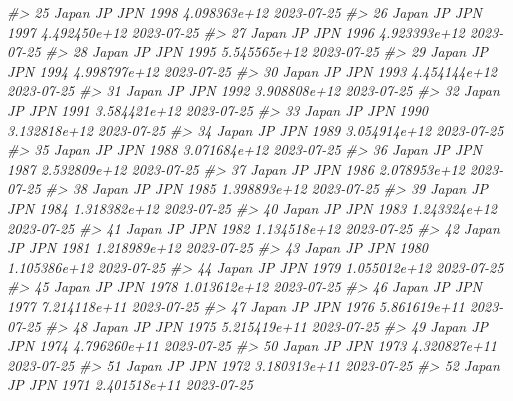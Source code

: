 \documentclass[
  xelatex, ja=standard]{bxjsbook}
\newenvironment{Shaded}{\begin{snugshade}}{\end{snugshade}}
\newcommand{\CommentTok}[1]{\textcolor[rgb]{0.56,0.35,0.01}{\textit{#1}}}
\theoremstyle{definition}
\theoremstyle{definition}
\theoremstyle{definition}
\theoremstyle{definition}
\theoremstyle{remark}
\begin{document}
\begin{Shaded}
\begin{Highlighting}[]
\CommentTok{\#\textgreater{} 25   Japan    JP   JPN 1998 4.098363e+12         2023{-}07{-}25}
\CommentTok{\#\textgreater{} 26   Japan    JP   JPN 1997 4.492450e+12         2023{-}07{-}25}
\CommentTok{\#\textgreater{} 27   Japan    JP   JPN 1996 4.923393e+12         2023{-}07{-}25}
\CommentTok{\#\textgreater{} 28   Japan    JP   JPN 1995 5.545565e+12         2023{-}07{-}25}
\CommentTok{\#\textgreater{} 29   Japan    JP   JPN 1994 4.998797e+12         2023{-}07{-}25}
\CommentTok{\#\textgreater{} 30   Japan    JP   JPN 1993 4.454144e+12         2023{-}07{-}25}
\CommentTok{\#\textgreater{} 31   Japan    JP   JPN 1992 3.908808e+12         2023{-}07{-}25}
\CommentTok{\#\textgreater{} 32   Japan    JP   JPN 1991 3.584421e+12         2023{-}07{-}25}
\CommentTok{\#\textgreater{} 33   Japan    JP   JPN 1990 3.132818e+12         2023{-}07{-}25}
\CommentTok{\#\textgreater{} 34   Japan    JP   JPN 1989 3.054914e+12         2023{-}07{-}25}
\CommentTok{\#\textgreater{} 35   Japan    JP   JPN 1988 3.071684e+12         2023{-}07{-}25}
\CommentTok{\#\textgreater{} 36   Japan    JP   JPN 1987 2.532809e+12         2023{-}07{-}25}
\CommentTok{\#\textgreater{} 37   Japan    JP   JPN 1986 2.078953e+12         2023{-}07{-}25}
\CommentTok{\#\textgreater{} 38   Japan    JP   JPN 1985 1.398893e+12         2023{-}07{-}25}
\CommentTok{\#\textgreater{} 39   Japan    JP   JPN 1984 1.318382e+12         2023{-}07{-}25}
\CommentTok{\#\textgreater{} 40   Japan    JP   JPN 1983 1.243324e+12         2023{-}07{-}25}
\CommentTok{\#\textgreater{} 41   Japan    JP   JPN 1982 1.134518e+12         2023{-}07{-}25}
\CommentTok{\#\textgreater{} 42   Japan    JP   JPN 1981 1.218989e+12         2023{-}07{-}25}
\CommentTok{\#\textgreater{} 43   Japan    JP   JPN 1980 1.105386e+12         2023{-}07{-}25}
\CommentTok{\#\textgreater{} 44   Japan    JP   JPN 1979 1.055012e+12         2023{-}07{-}25}
\CommentTok{\#\textgreater{} 45   Japan    JP   JPN 1978 1.013612e+12         2023{-}07{-}25}
\CommentTok{\#\textgreater{} 46   Japan    JP   JPN 1977 7.214118e+11         2023{-}07{-}25}
\CommentTok{\#\textgreater{} 47   Japan    JP   JPN 1976 5.861619e+11         2023{-}07{-}25}
\CommentTok{\#\textgreater{} 48   Japan    JP   JPN 1975 5.215419e+11         2023{-}07{-}25}
\CommentTok{\#\textgreater{} 49   Japan    JP   JPN 1974 4.796260e+11         2023{-}07{-}25}
\CommentTok{\#\textgreater{} 50   Japan    JP   JPN 1973 4.320827e+11         2023{-}07{-}25}
\CommentTok{\#\textgreater{} 51   Japan    JP   JPN 1972 3.180313e+11         2023{-}07{-}25}
\CommentTok{\#\textgreater{} 52   Japan    JP   JPN 1971 2.401518e+11         2023{-}07{-}25}

\end{Highlighting}
\end{Shaded}
\end{document}

